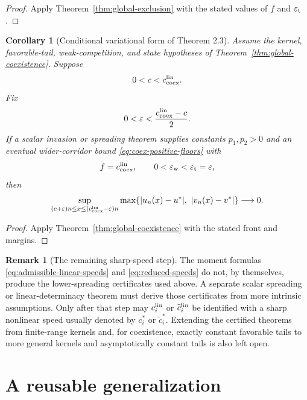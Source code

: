 \documentclass[11pt]{article}
\newtheorem{corollary}[theorem]{Corollary}
\theoremstyle{definition}
\newtheorem{remark}[theorem]{Remark}
\begin{document}
\begin{proof}
Apply Theorem~\ref{thm:global-exclusion} with the stated values of
\(f\) and \(\varepsilon_{\rm t}\).
\end{proof}

\begin{corollary}[Conditional variational form of Theorem 2.3]
\label{cor:conditional-coexistence-speed}
Assume the kernel, favorable-tail, weak-competition, and state hypotheses of
Theorem~\ref{thm:global-coexistence}.  Suppose
\[
  0<c<c_{\rm coex}^{\rm lin}.
\]
Fix
\[
  0<\varepsilon<
  \frac{c_{\rm coex}^{\rm lin}-c}{2}.
\]
If a scalar invasion or spreading theorem supplies constants
\(p_1,p_2>0\) and an eventual wider-corridor bound
\eqref{eq:coex-positive-floors} with
\[
  f=c_{\rm coex}^{\rm lin},
  \qquad
  0<\varepsilon_{\rm w}<\varepsilon_{\rm t}=\varepsilon,
\]
then
\[
  \sup_{(c+\varepsilon)n\leq x\leq
             (c_{\rm coex}^{\rm lin}-\varepsilon)n}
  \max\{|u_n(x)-u^*|,\ |v_n(x)-v^*|\}
  \longrightarrow0.
\]
\end{corollary}

\begin{proof}
Apply Theorem~\ref{thm:global-coexistence} with the stated front and margins.
\end{proof}

\begin{remark}[The remaining sharp-speed step]
\label{rem:sharp-speed-step}
The moment formulas \eqref{eq:admissible-linear-speeds} and
\eqref{eq:reduced-speeds} do not, by themselves, produce the lower-spreading
certificates used above.  A separate scalar spreading or linear-determinacy
theorem must derive those certificates from more intrinsic assumptions.
Only after that step may \(c_i^{\rm lin}\) or
\(\widetilde c_i^{\rm lin}\) be identified with a sharp nonlinear speed
usually denoted by \(c_i^*\) or \(\widetilde c_i^*\).
Extending the certified theorems from finite-range kernels and, for
coexistence, exactly constant favorable tails to more general kernels and
asymptotically constant tails is also left open.
\end{remark}

\section{A reusable generalization}
\end{document}
